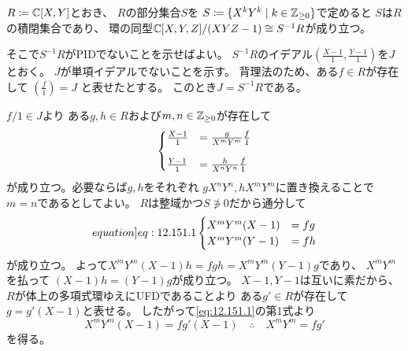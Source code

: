 \documentclass[report]{jlreq}
\begin{document}
\begin{answer}
    $R \coloneqq \mathbb{C}[X, Y]$とおき、
    $R$の部分集合$S$を
    $S \coloneqq \{ X^k Y^k \mid k \in \mathbb{Z}_{\ge 0} \}$で定めると
    $S$は$R$の積閉集合であり、
    環の同型$\mathbb{C}[X, Y, Z] / (XYZ - 1) \cong S^{-1}R$が成り立つ。
    \begin{innerproof}
        \TODO{}
    \end{innerproof}
    そこで$S^{-1}R$がPIDでないことを示せばよい。
    $S^{-1}R$のイデアル$\left(\frac{X - 1}{1}, \frac{Y - 1}{1}\right)$を$J$とおく。
    $J$が単項イデアルでないことを示す。
    背理法のため、ある$f \in R$が存在して
    $\left(\frac{f}{1}\right) = J$
    と表せたとする。
    このとき$J = S^{-1}R$である。
    \begin{innerproof}
        $f/1 \in J$より
        ある$g, h \in R$および$m, n \in \mathbb{Z}_{\ge 0}$が存在して
        \begin{equation}
            \begin{cases}
                \frac{X - 1}{1} &= \frac{g}{X^m Y^m} \frac{f}{1} \vspace{1em} \\
                \frac{Y - 1}{1} &= \frac{h}{X^n Y^n} \frac{f}{1}
            \end{cases}
        \end{equation}
        が成り立つ。必要ならば$g, h$をそれぞれ
        $g X^n Y^n, h X^m Y^m$に置き換えることで
        $m = n$であるとしてよい。
        $R$は整域かつ$S \not\ni 0$だから通分して
        \begin{equation}
            \label[equation]{eq:12.151.1}
            \begin{cases}
                X^m Y^m (X - 1) &= fg \\
                X^m Y^m (Y - 1) &= fh
            \end{cases}
        \end{equation}
        が成り立つ。
        よって$X^m Y^m (X - 1) h = fgh = X^m Y^m (Y - 1) g$であり、
        $X^m Y^m$を払って
        $(X - 1) h = (Y - 1) g$が成り立つ。
        $X - 1, Y - 1$は互いに素だから、
        $R$が体上の多項式環ゆえにUFDであることより
        ある$g' \in R$が存在して
        $g = g' (X - 1)$と表せる。
        したがって\cref{eq:12.151.1}の第1式より
        \begin{equation}
            X^m Y^m (X - 1) = fg' (X - 1)
            \quad
            \therefore
            \quad
            X^m Y^m = fg'
        \end{equation}
        を得る。

\end{innerproof}
\end{answer}
\end{document}
